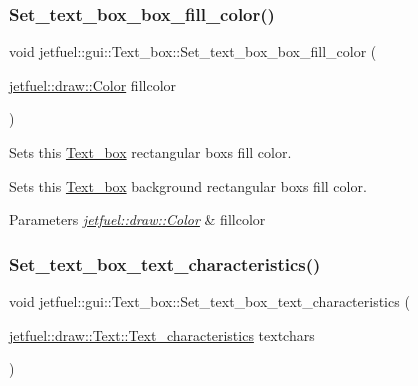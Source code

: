 \subsubsection{\texorpdfstring{Set\+\_\+text\+\_\+box\+\_\+box\+\_\+fill\+\_\+color()}{Set\_text\_box\_box\_fill\_color()}}
{\footnotesize\ttfamily void jetfuel\+::gui\+::\+Text\+\_\+box\+::\+Set\+\_\+text\+\_\+box\+\_\+box\+\_\+fill\+\_\+color (\begin{DoxyParamCaption}\item[{\hyperlink{classjetfuel_1_1draw_1_1Color}{jetfuel\+::draw\+::\+Color}}]{fillcolor }\end{DoxyParamCaption})\hspace{0.3cm}{\ttfamily [inline]}}



Sets this \hyperlink{classjetfuel_1_1gui_1_1Text__box}{Text\+\_\+box} rectangular box\textquotesingle{}s fill color. 

Sets this \hyperlink{classjetfuel_1_1gui_1_1Text__box}{Text\+\_\+box} background rectangular box\textquotesingle{}s fill color.


\begin{DoxyParams}{Parameters}
{\em \hyperlink{classjetfuel_1_1draw_1_1Color}{jetfuel\+::draw\+::\+Color}} & fillcolor \\
\hline
\end{DoxyParams}
\mbox{\label{classjetfuel_1_1gui_1_1Text__box_acec015bad50abfe391879139dbd5363c}} 
\subsubsection{\texorpdfstring{Set\+\_\+text\+\_\+box\+\_\+text\+\_\+characteristics()}{Set\_text\_box\_text\_characteristics()}}
{\footnotesize\ttfamily void jetfuel\+::gui\+::\+Text\+\_\+box\+::\+Set\+\_\+text\+\_\+box\+\_\+text\+\_\+characteristics (\begin{DoxyParamCaption}\item[{\hyperlink{structjetfuel_1_1draw_1_1Text_1_1Text__characteristics}{jetfuel\+::draw\+::\+Text\+::\+Text\+\_\+characteristics}}]{textchars }\end{DoxyParamCaption})\hspace{0.3cm}{\ttfamily [inline]}}



